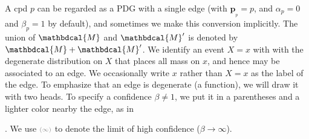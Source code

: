 \documentclass[twoside]{article}
\theoremstyle{plain}
\theoremstyle{definition}
\newcommand{\mat}[1]{\mathbf{#1}}
\newcommand{\ssub}[1]{_{\!_{#1}\!}}
\newcommand{\bp}[1][L]{\mat{p}\ssub{#1}}
\newcommand{\dg}[1]{\mathbdcal{#1}}
\begin{document}
A cpd $p$ can be regarded as a PDG with a single edge (with $\bp[p] =
p$, and  $\alpha_p=0$ and $\beta_p = 1$ by default), and sometimes we
make this conversion implicitly.
The union of $\dg M$ and $\dg M'$ is denoted by $\dg M + \dg M'$.
We identify an event $X=x$ with with the degenerate distribution on $X$ that places all mass on $x$, and hence may be associated to an edge.
We occasionally write $x$ rather than $X=x$ as the label of the edge.
To emphasize that an edge is degenerate (a function), we will draw it
with two heads.  
To specify a confidence $\beta \ne 1$, we put it in a parentheses
and a lighter color nearby the edge, as in
.
%
We use ${\scriptstyle\color{gray}(\infty)}$ to denote the limit of high confidence ($\beta \to \infty$).
\end{document}
